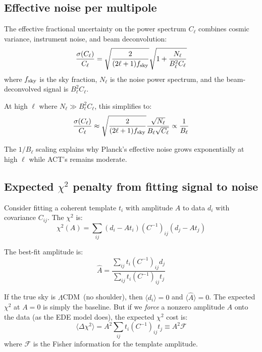 \documentclass[onecolumn,showpacs,preprintnumbers,amsmath,amssymb,prd]{revtex4-2}
\newcommand{\lcdm}{$\Lambda$CDM}
\begin{document}
\subsection{Effective noise per multipole}

The effective fractional uncertainty on the power spectrum $C_\ell$ combines 
cosmic variance, instrument noise, and beam deconvolution:
\begin{equation}
\frac{\sigma(C_\ell)}{C_\ell} = \sqrt{\frac{2}{(2\ell+1)f_{\rm sky}}} 
\sqrt{1 + \frac{N_\ell}{B_\ell^2 C_\ell}}
\end{equation}
where $f_{\rm sky}$ is the sky fraction, $N_\ell$ is the noise power spectrum, 
and the beam-deconvolved signal is $B_\ell^2 C_\ell$.

At high $\ell$ where $N_\ell \gg B_\ell^2 C_\ell$, this simplifies to:
\begin{equation}
\frac{\sigma(C_\ell)}{C_\ell} \approx \sqrt{\frac{2}{(2\ell+1)f_{\rm sky}}} 
\frac{\sqrt{N_\ell}}{B_\ell \sqrt{C_\ell}} \propto \frac{1}{B_\ell}
\end{equation}

The $1/B_\ell$ scaling explains why Planck's effective noise grows exponentially 
at high $\ell$ while ACT's remains moderate.

\subsection{Expected $\chi^2$ penalty from fitting signal to noise}

Consider fitting a coherent template $t_i$ with amplitude $A$ to data $d_i$ 
with covariance $C_{ij}$. The $\chi^2$ is:
\begin{equation}
\chi^2(A) = \sum_{ij} (d_i - A t_i)(C^{-1})_{ij}(d_j - A t_j)
\end{equation}

The best-fit amplitude is:
\begin{equation}
\hat A = \frac{\sum_{ij} t_i (C^{-1})_{ij} d_j}{\sum_{ij} t_i (C^{-1})_{ij} t_j}
\end{equation}

If the true sky is \lcdm\ (no shoulder), then $\langle d_i \rangle = 0$ and 
$\langle \hat A \rangle = 0$. The expected $\chi^2$ at $A = 0$ is simply the 
baseline. But if we \emph{force} a nonzero amplitude $A$ onto the data 
(as the EDE model does), the expected $\chi^2$ cost is:
\begin{equation}
\langle \Delta\chi^2 \rangle = A^2 \sum_{ij} t_i (C^{-1})_{ij} t_j \equiv A^2 \mathcal{F}
\end{equation}
where $\mathcal{F}$ is the Fisher information for the template amplitude.
\end{document}
